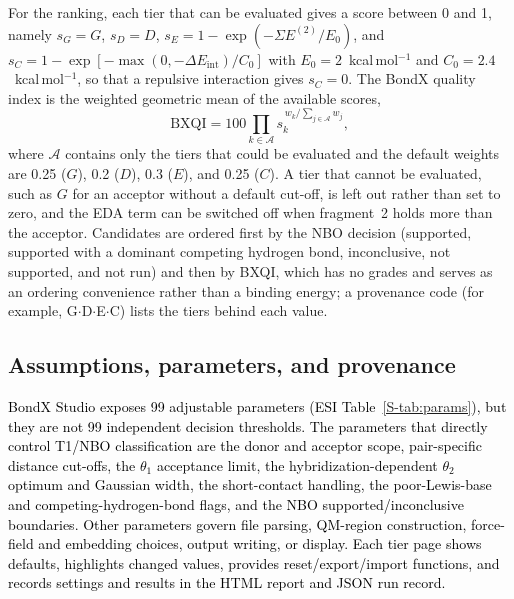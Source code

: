 \documentclass[journal=jcisd8,manuscript=article,layout=two-column]{achemso}
\newcommand{\tcb}[1]{{\textcolor{black}{#1}}}
\newcommand{\ET}{E^{(2)}}
\newcommand{\BX}{BondX Studio}
\newcommand{\kcal}{kcal\,mol$^{-1}$}
\begin{document}
For the ranking, each tier that can be evaluated gives a score between 0 and 1, namely $s_G = G$, $s_D = D$, $s_E = 1-\exp(-\Sigma\ET/E_0)$, and $s_C = 1-\exp[-\max(0,-\Delta E_\mathrm{int})/C_0]$ with $E_0 = 2$~\kcal{} and $C_0 = 2.4$~\kcal{}, so that a repulsive interaction gives $s_C = 0$. The BondX quality index is the weighted geometric mean of the available scores,
\begin{equation}
\mathrm{BXQI}=100\prod_{k\in\mathcal{A}} s_k^{\,w_k/\sum_{j\in\mathcal{A}} w_j},
\end{equation}
where $\mathcal{A}$ contains only the tiers that could be evaluated and the default weights are 0.25 ($G$), 0.2 ($D$), 0.3 ($E$), and 0.25 ($C$). A tier that cannot be evaluated, such as $G$ for an acceptor without a default cut-off, is left out rather than set to zero, and the EDA term can be switched off when fragment~2 holds more than the acceptor. Candidates are ordered first by the NBO decision (supported, supported with a dominant competing hydrogen bond, inconclusive, not supported, and not run) and then by BXQI, which has no grades and serves as an ordering convenience rather than a binding energy; a provenance code (for example, G$\cdot$D$\cdot$E$\cdot$C) lists the tiers behind each value.

\subsection{Assumptions, parameters, and provenance}
\tcb{BondX Studio exposes 99 adjustable parameters (ESI Table~\ref{S-tab:params}), but they are not 99 independent decision thresholds. The parameters that directly control T1/NBO classification are the donor and acceptor scope, pair-specific distance cut-offs, the $\theta_1$ acceptance limit, the hybridization-dependent $\theta_2$ optimum and Gaussian width, the short-contact handling, the poor-Lewis-base and competing-hydrogen-bond flags, and the NBO supported/inconclusive boundaries. Other parameters govern file parsing, QM-region construction, force-field and embedding choices, output writing, or display. Each tier page shows defaults, highlights changed values, provides reset/export/import functions, and records settings and results in the HTML report and JSON run record.}
\end{document}

